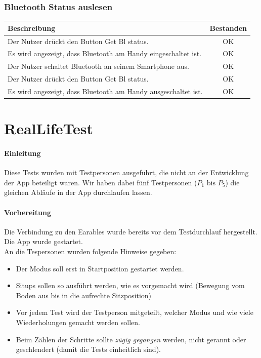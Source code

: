 \documentclass[a4paper,12pt]{article}
\newcommand{\testok}[0]{
	\cellcolor{green!25} OK
}
\begin{document}
\subsubsection{Bluetooth Status auslesen}
\begin{tabular}{ | p{12cm} | c| }
	\hline
	\textbf{Beschreibung} & \textbf{Bestanden}\\
	\hline
	Der Nutzer drückt den Button \glqq{}Get Bl status\grqq{}. & \testok \\
	\hline
	Es wird angezeigt, dass Bluetooth am Handy eingeschaltet ist. & \testok \\
	\hline
	Der Nutzer schaltet Bluetooth an seinem Smartphone aus. & \testok \\
	\hline
	Der Nutzer drückt den Button \glqq{}Get Bl status\grqq{}. & \testok \\
	\hline
	Es wird angezeigt, dass Bluetooth am Handy ausgeschaltet ist. & \testok \\
	\hline
\end{tabular}

\section{RealLifeTest}	%
\paragraph{Einleitung}
Diese Tests wurden mit Testpersonen ausgeführt, die nicht an der Entwicklung der App beteiligt waren. Wir haben dabei fünf Testpersonen ($P_1 \text{ bis } P_5$) die gleichen Abläufe in der App durchlaufen lassen.
\paragraph{Vorbereitung}
Die Verbindung zu den Earables wurde bereits vor dem Testdurchlauf hergestellt.
Die App wurde gestartet.\\
An die Tespersonen wurden folgende Hinweise gegeben:
\begin{itemize}
	\item Der Modus soll erst in Startposition gestartet werden.
	\item Situps sollen so ausführt werden, wie es vorgemacht wird (Bewegung vom Boden aus bis in die aufrechte Sitzposition)
	\item Vor jedem Test wird der Testperson mitgeteilt, welcher Modus und wie viele Wiederholungen gemacht werden sollen.
	\item Beim Zählen der Schritte sollte \textit{zügig gegangen} werden, nicht gerannt oder geschlendert (damit die Tests einheitlich sind).
\end{itemize}
\end{document}

